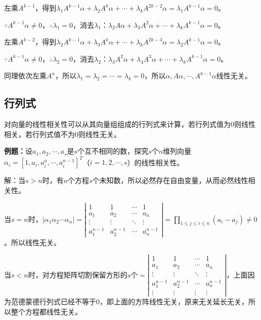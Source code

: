 \documentclass[UTF8, 12pt]{ctexart}
\begin{document}
左乘$A^{k-1}$，得到$\lambda_1A^{k-1}\alpha+\lambda_2A^k\alpha+\cdots+\lambda_kA^{2k-2}\alpha=\lambda_1A^{k-1}\alpha=0$。

$\because A^{k-1}\alpha\neq0$，$\therefore\lambda_1=0$，消去$\lambda_1$：$\lambda_2A\alpha+\lambda_3A^2\alpha+\cdots+\lambda_kA^{k-1}\alpha=0$。

左乘$A^{k-2}$，得到$\lambda_2A^{k-1}\alpha+\lambda_3A^k\alpha+\cdots+\lambda_kA^{2k-3}\alpha=\lambda_2A^{k-1}\alpha=0$。

$\because A^{k-1}\alpha\neq0$，$\therefore\lambda_2=0$，消去$\lambda_2$：$\lambda_3A^2\alpha+\lambda_4A^3\alpha+\cdots+\lambda_kA^{k-1}\alpha=0$。

同理依次左乘$A^n$，所以$\lambda_1=\lambda_2=\cdots=\lambda_k=0$，所以$\alpha,A\alpha,\cdots,A^{k-1}\alpha$线性无关。

\subsection{行列式}

对向量的线性相关性可以从其向量组组成的行列式来计算，若行列式值为0则线性相关，若行列式值不为0则线性无关。

\textbf{例题：}设$a_1,a_2,\cdots,a_s$是$s$个互不相同的数，探究$s$个$n$维列向量$\alpha_i=[1,a_i,a_i^a,\cdots,a_i^{n-1}]^T$（$i=1,2,\cdots,s$）的线性相关性。

解：当$s>n$时，有$n$个方程$s$个未知数，所以必然存在自由变量，从而必然线性相关性。

当$s=n$时，$\vert\alpha_1 \alpha_2 \cdots \alpha_n\vert=\left|\begin{array}{cccc}
    1 & 1 & \cdots & 1 \\
    a_1 & a_2 & \cdots & a_n \\
    \vdots & \vdots & \ddots & \vdots \\
    a_1^{n-1} & a_2^{n-1} & \cdots & a_n^{n-1}
\end{array}\right|=\prod\limits_{1\leqslant j\leqslant i\leqslant n}(a_i-a_j)\neq0$。所以线性无关。

当$s<n$时，对方程矩阵切割保留方形的$s$个$=\left|\begin{array}{cccc}
    1 & 1 & \cdots & 1 \\
    a_1 & a_2 & \cdots & a_n \\
    \vdots & \vdots & \ddots & \vdots \\
    a_1^{n-1} & a_2^{n-1} & \cdots & a_n^{n-1} \\
    \vdots & \vdots & \vdots & \vdots
\end{array}\right|$，上面因为范德蒙德行列式已经不等于0，即上面的方阵线性无关，原来无关延长无关，所以整个方程都线性无关。
\end{document}
